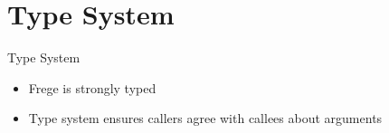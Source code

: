 \documentclass[12pt]{beamer}
\newcommand{\frege}{\textsf{Frege}\xspace}
\begin{document}
\section{Type System}
\begin{frame}{\LARGE Type System}
  \begin{itemize}
  \item \frege is strongly typed
  \item Type system ensures callers agree with callees about arguments
  \end{itemize}
\end{frame}


\end{document}
